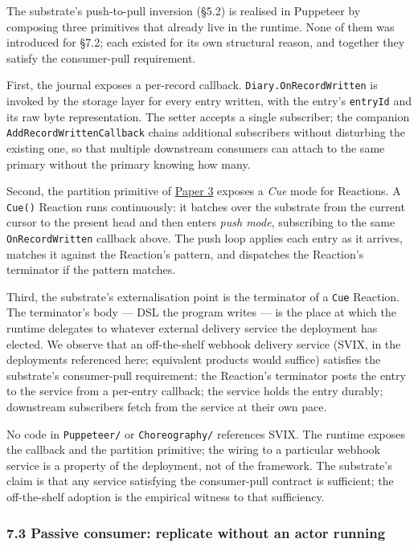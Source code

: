 \documentclass[
]{article}
\begin{document}
The substrate's push-to-pull inversion (§5.2) is realised in Puppeteer
by composing three primitives that already live in the runtime. None of
them was introduced for §7.2; each existed for its own structural
reason, and together they satisfy the consumer-pull requirement.

First, the journal exposes a per-record callback.
\texttt{Diary.OnRecordWritten} is invoked by the storage layer for every
entry written, with the entry's \texttt{entryId} and its raw byte
representation. The setter accepts a single subscriber; the companion
\texttt{AddRecordWrittenCallback} chains additional subscribers without
disturbing the existing one, so that multiple downstream consumers can
attach to the same primary without the primary knowing how many.

Second, the partition primitive of
\href{03-reactions-and-partition.md}{Paper 3} exposes a \emph{Cue} mode
for Reactions. A \texttt{Cue()} Reaction runs continuously: it batches
over the substrate from the current cursor to the present head and then
enters \emph{push mode}, subscribing to the same
\texttt{OnRecordWritten} callback above. The push loop applies each
entry as it arrives, matches it against the Reaction's pattern, and
dispatches the Reaction's terminator if the pattern matches.

Third, the substrate's externalisation point is the terminator of a
\texttt{Cue} Reaction. The terminator's body --- DSL the program writes
--- is the place at which the runtime delegates to whatever external
delivery service the deployment has elected. We observe that an
off-the-shelf webhook delivery service (SVIX, in the deployments
referenced here; equivalent products would suffice) satisfies the
substrate's consumer-pull requirement: the Reaction's terminator posts
the entry to the service from a per-entry callback; the service holds
the entry durably; downstream subscribers fetch from the service at
their own pace.

No code in \texttt{Puppeteer/} or \texttt{Choreography/} references
SVIX. The runtime exposes the callback and the partition primitive; the
wiring to a particular webhook service is a property of the deployment,
not of the framework. The substrate's claim is that any service
satisfying the consumer-pull contract is sufficient; the off-the-shelf
adoption is the empirical witness to that sufficiency.

\subsubsection{7.3 Passive consumer: replicate without an actor
running}\label{passive-consumer-replicate-without-an-actor-running}
\end{document}
